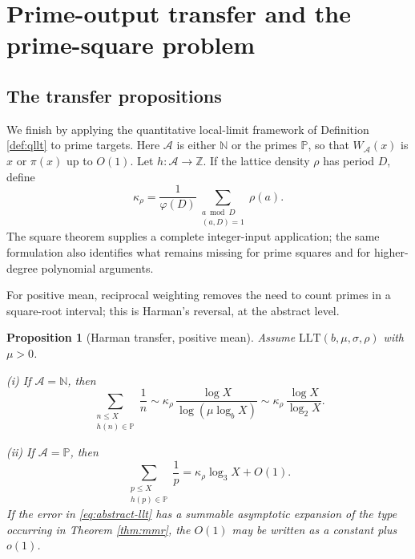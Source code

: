 \documentclass[11pt,reqno]{amsart}
\theoremstyle{plain}
\newtheorem{proposition}[theorem]{Proposition}
\theoremstyle{definition}
\newcommand{\N}{\mathbb{N}}
\newcommand{\Z}{\mathbb{Z}}
\newcommand{\Pp}{\mathbb{P}}
\newcommand{\1}{\mathbf 1}
\begin{document}
\section{Prime-output transfer and the prime-square problem}\label{sec:transfer}

\subsection{The transfer propositions}
We finish by applying the quantitative local-limit framework of Definition \ref{def:qllt} to prime targets.  Here $\mathcal A$ is either $\N$ or the primes $\Pp$, so that $W_{\mathcal A}(x)$ is $x$ or $\pi(x)$ up to $O(1)$.  Let $h:\mathcal A\to\Z$.  If the lattice density $\rho$ has period $D$, define
\begin{equation}\label{eq:kappa}
 \kappa_\rho=\frac1{\varphi(D)}
 \sum_{\substack{a\bmod D\\(a,D)=1}}\rho(a).
\end{equation}
The square theorem supplies a complete integer-input application; the same formulation also identifies what remains missing for prime squares and for higher-degree polynomial arguments.

For positive mean, reciprocal weighting removes the need to count primes in a square-root interval; this is Harman's reversal, at the abstract level.

\begin{proposition}[Harman transfer, positive mean]\label{prop:transfer}
Assume $\mathrm{LLT}(b,\mu,\sigma,\rho)$ with $\mu>0$.

\smallskip
\noindent
(i) If $\mathcal A=\N$, then
\[
 \sum_{\substack{n\le X\\h(n)\in\Pp}}\frac1n
 \sim \kappa_\rho\,\frac{\log X}{\log(\mu\log_bX)}
 \sim \kappa_\rho\,\frac{\log X}{\log_2X}.
\]

\smallskip
\noindent
(ii) If $\mathcal A=\Pp$, then
\[
 \sum_{\substack{p\le X\\h(p)\in\Pp}}\frac1p
 =\kappa_\rho\log_3X+O(1).
\]
If the error in \eqref{eq:abstract-llt} has a summable asymptotic expansion of the type occurring in Theorem \ref{thm:mmr}, the $O(1)$ may be written as a constant plus $o(1)$.
\end{proposition}
\end{document}

